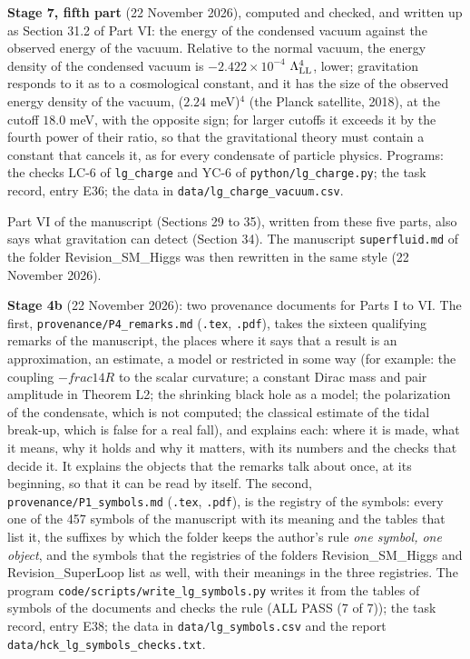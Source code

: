 \documentclass[
  10pt,
]{article}
\begin{document}
\textbf{Stage 7, fifth part} (22 November 2026), computed and checked,
and written up as Section 31.2 of Part VI: the energy of the condensed
vacuum against the observed energy of the vacuum. Relative to the normal
vacuum, the energy density of the condensed vacuum is
\(-2.422\times10^{-4}\) \(\Lambda_{\rm LL}^4\), lower; gravitation
responds to it as to a cosmological constant, and it has the size of the
observed energy density of the vacuum, (\(2.24\) meV)\(^4\) (the Planck
satellite, 2018), at the cutoff \(18.0\) meV, with the opposite sign;
for larger cutoffs it exceeds it by the fourth power of their ratio, so
that the gravitational theory must contain a constant that cancels it,
as for every condensate of particle physics. Programs: the checks LC-6
of \texttt{lg\_charge} and YC-6 of \texttt{python/lg\_charge.py}; the
task record, entry E36; the data in
\texttt{data/lg\_charge\_vacuum.csv}.

Part VI of the manuscript (Sections 29 to 35), written from these five
parts, also says what gravitation can detect (Section 34). The
manuscript \texttt{superfluid.md} of the folder Revision\_SM\_Higgs was
then rewritten in the same style (22 November 2026).

\textbf{Stage 4b} (22 November 2026): two provenance documents for Parts
I to VI. The first, \texttt{provenance/P4\_remarks.md} (\texttt{.tex},
\texttt{.pdf}), takes the sixteen qualifying remarks of the manuscript,
the places where it says that a result is an approximation, an estimate,
a model or restricted in some way (for example: the coupling
\(- frac14R\) to the scalar curvature; a constant Dirac mass and pair
amplitude in Theorem L2; the shrinking black hole as a model; the
polarization of the condensate, which is not computed; the classical
estimate of the tidal break-up, which is false for a real fall), and
explains each: where it is made, what it means, why it holds and why it
matters, with its numbers and the checks that decide it. It explains the
objects that the remarks talk about once, at its beginning, so that it
can be read by itself. The second, \texttt{provenance/P1\_symbols.md}
(\texttt{.tex}, \texttt{.pdf}), is the registry of the symbols: every
one of the 457 symbols of the manuscript with its meaning and the tables
that list it, the suffixes by which the folder keeps the author's rule
\emph{one symbol, one object}, and the symbols that the registries of
the folders Revision\_SM\_Higgs and Revision\_SuperLoop list as well,
with their meanings in the three registries. The program
\texttt{code/scripts/write\_lg\_symbols.py} writes it from the tables of
symbols of the documents and checks the rule (ALL PASS (7 of 7)); the
task record, entry E38; the data in \texttt{data/lg\_symbols.csv} and
the report \texttt{data/hck\_lg\_symbols\_checks.txt}.
\end{document}
